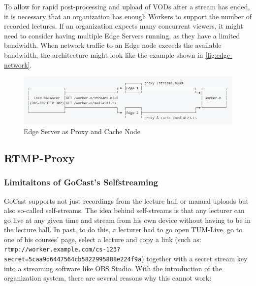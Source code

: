 To allow for rapid post-processing and upload of \ac{VOD}s after a stream has ended, it is necessary that an organization has enough Workers to support the number of recorded lectures.
If an organization expects many concurrent viewers, it might need to consider having multiple Edge Servers running, as they have a limited bandwidth.
When network traffic to an Edge node exceeds the available bandwidth, the architecture might look like the example shown in \autoref{fig:edge-network}.

\begin{figure}[htpb]
    \centering
    \includegraphics[width=\linewidth]{images/EdgeNetwork.png}
    \caption[Edge Server as Proxy and Cache Node]{Edge Server as Proxy and Cache Node}\label{fig:edge-network}
\end{figure}


\subsection{RTMP-Proxy}

\subsubsection{Limitaitons of GoCast's Selfstreaming}

GoCast supports not just recordings from the lecture hall or manual uploads but also so-called self-streams. The idea behind self-streams is that any lecturer can go live at any given time and stream from his own device without having to be in the lecture hall. In past, to do this, a lecturer had to go open TUM-Live, go to one of his courses' page, select a lecture and copy a link (such as: \texttt{rtmp://worker.example.com/cs-123? secret=5caa9d6447564cb5822995888e224f9a}) together with a secret stream key into a streaming software like OBS Studio. With the introduction of the organization system, there are several reasons why this cannot work:

